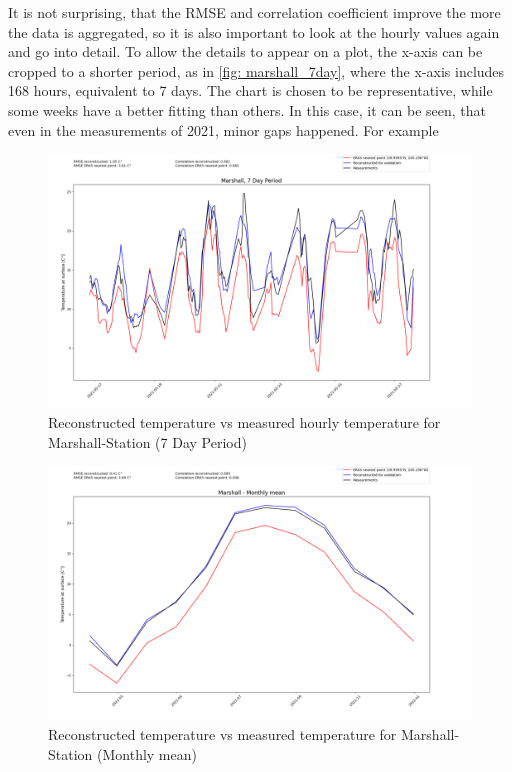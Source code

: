 It is not surprising, that the RMSE and correlation coefficient improve the more the data is aggregated, so it is also important to look at the hourly values again and go into detail. To allow the details to appear on a plot, the x-axis can be cropped to a shorter period, as in \autoref{fig: marshall_7day}, where the x-axis includes 168 hours, equivalent to 7 days. The chart is chosen to be representative, while some weeks have a better fitting than others. In this case, it can be seen, that even in the measurements of 2021, minor gaps happened. For example  


\begin{figure}
    \centering
    \includegraphics[width=1.02\textwidth]{resources/images/charts/marshall_eval_grib_final/Marshall, 7 Day Period_1_2_3.png}
    \caption{Reconstructed temperature vs measured hourly temperature for Marshall-Station (7 Day Period)}
    \label{fig: marshall_7day}
\end{figure}

\begin{figure}
    \centering
    \includegraphics[width=1.02\textwidth]{resources/images/charts/marshall_eval_grib_final/Marshall - Monthly mean.png}
    \caption{Reconstructed temperature vs measured temperature for Marshall-Station (Monthly mean)}
\end{figure}


